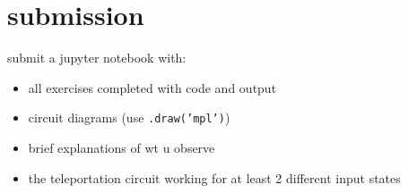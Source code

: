 \documentclass[11pt,a4paper]{article}
\theoremstyle{definition}
\theoremstyle{remark}
\newcounter{exercise}[section]
\begin{document}
\section{submission}

submit a jupyter notebook with:
\begin{itemize}[leftmargin=*]
  \item all exercises completed with code and output
  \item circuit diagrams (use \texttt{.draw('mpl')})
  \item brief explanations of wt u observe
  \item the teleportation circuit working for at least 2 different input states
\end{itemize}
\end{document}
